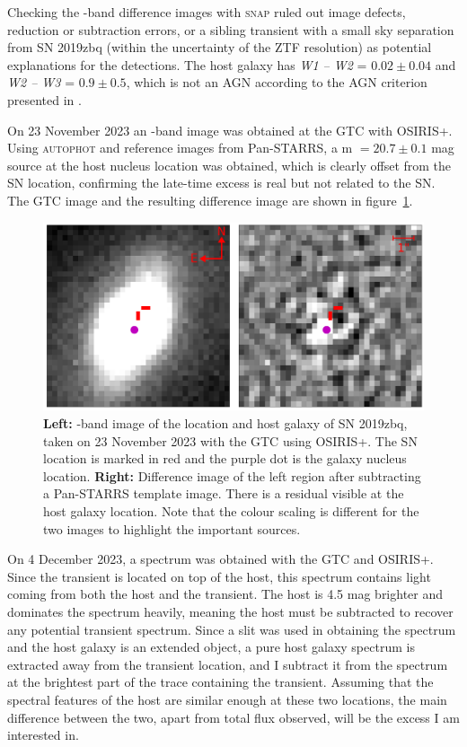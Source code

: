 \documentclass[a4paper,oneside,12pt, class=Latex/Classes/PhDthesisPSnPDF, crop=false]{standalone}
\begin{document}
Checking the \ztfr-band difference images with \textsc{snap} ruled out image defects, reduction or subtraction errors, or a sibling transient with a small sky separation from SN 2019zbq (within the uncertainty of the ZTF resolution) as potential explanations for the detections. The host galaxy has \textit{W1 -- W2} = $0.02\pm 0.04$ and  \textit{W2 -- W3} = $0.9\pm 0.5$, which is not an AGN according to the AGN criterion presented in \citet{WISE_crit}.

On 23 November 2023 an \ztfr-band image was obtained at the GTC with OSIRIS+. Using \textsc{autophot} and reference images from Pan-STARRS, a m $=20.7\pm0.1$ mag source at the host nucleus location was obtained, which is clearly offset from the SN location, confirming the late-time excess is real but not related to the SN. The GTC image and the resulting difference image are shown in figure~\ref{2019zbq_difim}.

\begin{figure}
    \centering
    \includegraphics[width=\textwidth]{../Images/chapter_5/2020zbq_difim.png}
    \caption[Location and host galaxy of SN 2019zbq, imaged with ZTF and GTC.]{\textbf{Left:} \ztfr-band image of the location and host galaxy of SN 2019zbq, taken on 23 November 2023 with the GTC using OSIRIS+. The SN location is marked in red and the purple dot is the galaxy nucleus location. \textbf{Right:} Difference image of the left region after subtracting a Pan-STARRS template image. There is a residual visible at the host galaxy location. Note that the colour scaling is different for the two images to highlight the important sources.}
    \label{2019zbq_difim}
\end{figure}

On 4 December 2023, a spectrum was obtained with the GTC and OSIRIS+. Since the transient is located on top of the host, this spectrum contains light coming from both the host and the transient. The host is 4.5 mag brighter and dominates the spectrum heavily, meaning the host must be subtracted to recover any potential transient spectrum. Since a slit was used in obtaining the spectrum and the host galaxy is an extended object, a pure host galaxy spectrum is extracted away from the transient location, and I subtract it from the spectrum at the brightest part of the trace containing the transient. Assuming that the spectral features of the host are similar enough at these two locations, the main difference between the two, apart from total flux observed, will be the excess I am interested in.
\end{document}
